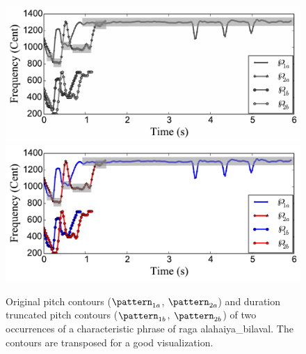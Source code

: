 \begin{figure}
	\begin{center}
		\ifdefined\PRINTVER
			\includegraphics[width=\figSizeEightyFive]{ch06_patterns/figures/ImprovingSimilarity/Hindusani_flat_note_compression_example_reversed_BW.pdf}
		\else
			\includegraphics[width=\figSizeEightyFive]{ch06_patterns/figures/ImprovingSimilarity/Hindusani_flat_note_compression_example_reversed.pdf}
		\fi
	\end{center}
	\caption[Examples of melodic patterns after duration truncation]{Original pitch contours ($\pattern_{1a}$, $\pattern_{2a}$) and duration truncated pitch contours ($\pattern_{1b}$, $\pattern_{2b}$) of two occurrences of a characteristic phrase of \gls{raga} \gls{alahaiya_bilaval}. The contours are transposed for a good visualization.}
	\label{fig:flatCompressionExample}
\end{figure}



